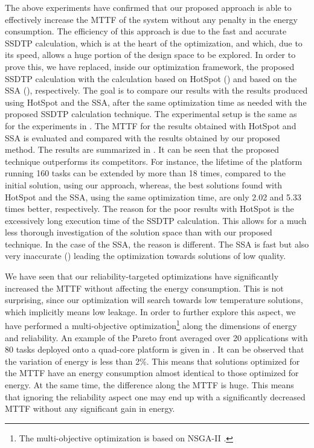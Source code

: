 The above experiments have confirmed that our proposed approach is able to effectively increase the MTTF of the system without any penalty in the energy consumption. The efficiency of this approach is due to the fast and accurate SSDTP calculation, which is at the heart of the optimization, and which, due to its speed, allows a huge portion of the design space to be explored. In order to prove this, we have replaced, inside our optimization framework, the proposed SSDTP calculation with the calculation based on HotSpot () and based on the SSA (), respectively. The goal is to compare our results with the results produced using HotSpot and the SSA, after the same optimization time as needed with the proposed SSDTP calculation technique. The experimental setup is the same as for the experiments in . The MTTF for the results obtained with HotSpot and SSA is evaluated and compared with the results obtained by our proposed method. The results are summarized in . It can be seen that the proposed technique outperforms its competitors. For instance, the lifetime of the platform running 160 tasks can be extended by more than 18 times, compared to the initial solution, using our approach, whereas, the best solutions found with HotSpot and the SSA, using the same optimization time, are only 2.02 and 5.33 times better, respectively. The reason for the poor results with HotSpot is the excessively long execution time of the SSDTP calculation. This allows for a much less thorough investigation of the solution space than with our proposed technique. In the case of the SSA, the reason is different. The SSA is fast but also very inaccurate () leading the optimization towards solutions of low quality.

We have seen that our reliability-targeted optimizations have significantly increased the MTTF without affecting the energy consumption. This is not surprising, since our optimization will search towards low temperature solutions, which implicitly means low leakage. In order to further explore this aspect, we have performed a multi-objective optimization\footnote{The multi-objective optimization is based on NSGA-II \cite{deb2002}.} along the dimensions of energy and reliability. An example of the Pareto front averaged over 20 applications with 80 tasks deployed onto a quad-core platform is given in . It can be observed that the variation of energy is less than 2\%. This means that solutions optimized for the MTTF have an energy consumption almost identical to those optimized for energy. At the same time, the difference along the MTTF is huge. This means that ignoring the reliability aspect one may end up with a significantly decreased MTTF without any significant gain in energy.

